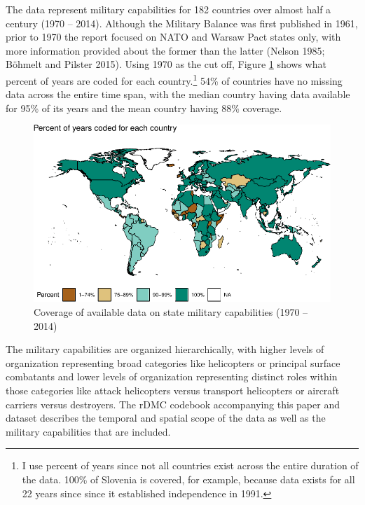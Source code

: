\documentclass[
]{article}
\begin{document}
The data represent military capabilities for 182 countries over almost half a century (1970 -- 2014). Although the Military Balance was first published in 1961, prior to 1970 the report focused on NATO and Warsaw Pact states only, with more information provided about the former than the latter (Nelson 1985; Böhmelt and Pilster 2015). Using 1970 as the cut off, Figure \ref{fig:missingness} shows what percent of years are coded for each country.\footnote{I use percent of years since not all countries exist across the entire duration of the data. 100\% of Slovenia is covered, for example, because data exists for all 22 years since since it established independence in 1991.} 54\% of countries have no missing data across the entire time span, with the median country having data available for 95\% of its years and the mean country having 88\% coverage.

\begin{figure}[H]

{\centering \includegraphics{2021-09-24_rDMC_files/figure-latex/missingness-1} 

}

\caption{Coverage of available data on state military capabilities (1970 -- 2014)}\label{fig:missingness}
\end{figure}

The military capabilities are organized hierarchically, with higher levels of organization representing broad categories like helicopters or principal surface combatants and lower levels of organization representing distinct roles within those categories like attack helicopters versus transport helicopters or aircraft carriers versus destroyers. The rDMC codebook accompanying this paper and dataset describes the temporal and spatial scope of the data as well as the military capabilities that are included.
\end{document}
